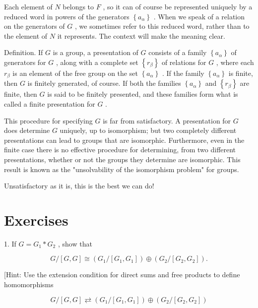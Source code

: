 \documentclass[10pt]{article}
\begin{document}
Each element of \(N\) belongs to \(F\) , so it can of course be represented uniquely by a reduced word in powers of the generators \(\left\{  {a}_{\alpha }\right\}\) . When we speak of a relation on the generators of \(G\) , we sometimes refer to this reduced word, rather than to the element of \(N\) it represents. The context will make the meaning clear.

Definition. If \(G\) is a group, a presentation of \(G\) consists of a family \(\left\{  {a}_{\alpha }\right\}\) of generators for \(G\) , along with a complete set \(\left\{  {r}_{\beta }\right\}\) of relations for \(G\) , where each \({r}_{\beta }\) is an element of the free group on the set \(\left\{  {a}_{\alpha }\right\}\) . If the family \(\left\{  {a}_{\alpha }\right\}\) is finite, then \(G\) is finitely generated, of course. If both the families \(\left\{  {a}_{\alpha }\right\}\) and \(\left\{  {r}_{\beta }\right\}\) are finite, then \(G\) is said to be finitely presented, and these families form what is called a finite presentation for \(G\) .

This procedure for specifying \(G\) is far from satisfactory. A presentation for \(G\) does determine \(G\) uniquely, up to isomorphism; but two completely different presentations can lead to groups that are isomorphic. Furthermore, even in the finite case there is no effective procedure for determining, from two different presentations, whether or not the groups they determine are isomorphic. This result is known as the "unsolvability of the isomorphism problem" for groups.

Unsatisfactory as it is, this is the best we can do!

\section*{Exercises}

1. If \(G = {G}_{1} * {G}_{2}\) , show that

\[
G/\left\lbrack  {G,G}\right\rbrack   \cong  \left( {{G}_{1}/\left\lbrack  {{G}_{1},{G}_{1}}\right\rbrack  }\right)  \oplus  \left( {{G}_{2}/\left\lbrack  {{G}_{2},{G}_{2}}\right\rbrack  }\right) .
\]

[Hint: Use the extension condition for direct sums and free products to define homomorphisms

\[
G/\left\lbrack  {G,G}\right\rbrack   \rightleftarrows  \left( {{G}_{1}/\left\lbrack  {{G}_{1},{G}_{1}}\right\rbrack  }\right)  \oplus  \left( {{G}_{2}/\left\lbrack  {{G}_{2},{G}_{2}}\right\rbrack  }\right)
\]
\end{document}
